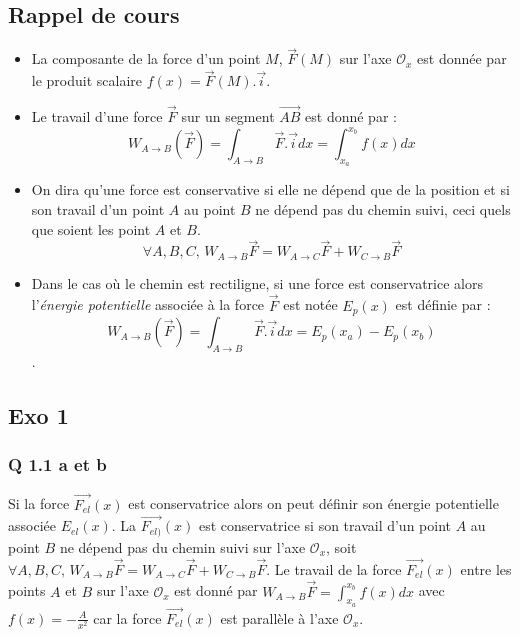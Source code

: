 \documentclass[]{book}
\theoremstyle{definition}
\begin{document}
\subsection*{Rappel de cours}
\begin{itemize}
\item La composante de la force d'un point $M$, $\overrightarrow{F}(M)$ sur l'axe $\mathcal{O}_x$ est donn\'ee par le produit scalaire $f(x) = \overrightarrow{F}(M).\overrightarrow{i}$. 
\item Le travail d'une force $\overrightarrow{F}$ sur un segment $\overrightarrow{AB}$ est donn\'e par :
$$W_{A \to B}(\overrightarrow{F}) = \int_{A \to B} \overrightarrow{F}.\overrightarrow{i}dx = \int_{x_a}^{x_b} f(x)dx$$ 
\item On dira qu'une force est conservative si elle ne d\'epend que de la position et si son travail d'un point $A$ au point $B$ ne d\'epend pas du chemin suivi, ceci quels que soient les point $A$ et $B$.
$$\forall A,B,C,\, W_{A \to B} \overrightarrow{F} = W_{A \to C} \overrightarrow{F} + W_{C \to B} \overrightarrow{F}$$
\item Dans le cas o\`u le chemin est rectiligne, si une force est conservatrice alors l'\emph{\'energie potentielle} associ\'ee \`a la force $\overrightarrow{F}$ est not\'ee $E_p(x)$ est d\'efinie par :
$$W_{A \to B}(\overrightarrow{F}) = \int_{A \to B} \overrightarrow{F}.\overrightarrow{i}dx = E_p(x_a) - E_p(x_b)$$. 
\end{itemize}


\subsection*{Exo 1}

\subsubsection*{Q 1.1 a et b}
Si la force $\overrightarrow{F_{el}}(x)$ est conservatrice alors on peut d\'efinir son \'energie potentielle associ\'ee $E_{el}(x)$. La $\overrightarrow{F_{el)}}(x)$ est conservatrice si son travail d'un point $A$ au point $B$ ne d\'epend pas du chemin suivi sur l'axe $\mathcal{O}_x$, soit $\forall A,B,C,\, W_{A \to B} \overrightarrow{F} = W_{A \to C} \overrightarrow{F} + W_{C \to B} \overrightarrow{F}$. Le travail de la force $\overrightarrow{F_{el}}(x)$ entre les points $A$ et $B$ sur l'axe $\mathcal{O}_x$ est donn\'e par $W_{A \to B} \overrightarrow{F} = \int_{x_a}^{x_b} f(x)dx$ avec $f(x) = -\frac{A}{x^2}$ car la force $\overrightarrow{F_{el}}(x)$ est parall\`ele \`a l'axe $\mathcal{O}_x$.\\
\end{document}
